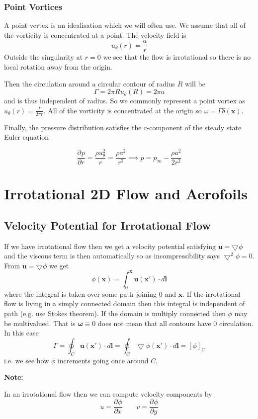 \documentclass[11pt]{article}
\newcommand*{\pd}[3][]{\ensuremath{\frac{\partial^{#1} {#2}}{\partial {#3}^{#1}}}}
\newcommand{\grad}{\bigtriangledown}
\newcommand{\mv}[1]{\bm{#1}}
\newenvironment{note}
    {\textbf{Note:}\begin{mdframed}[backgroundcolor=white, roundcorner=5pt, linewidth=0pt]}
    {\end{mdframed}}
\begin{document}
\subsubsection{Point Vortices}
A point vertex is an idealisation which we will often use.
We assume that all of the vorticity is concentrated at a point.
The velocity field is
\[
	u_\theta(r) = \frac{a}{r}
\]
Outside the singularity at $r=0$ we see that the flow is irrotational so there is no local rotation away from the origin.

Then the circulation around a circular contour of radius $R$ will be
\[
	\Gamma = 2\pi R u_\theta(R) = 2\pi a
\]
and is thus independent of radius.
So we commonly represent a point vortex as $u_\theta(r) = \frac{\Gamma}{2\pi r}$.
All of the vorticity is concentrated at the origin so $\omega = \Gamma \delta(\mv{x})$.

Finally, the pressure distribution satisfies the $r$-component of the steady state Euler equation

\[
	\pd{p}{r}= \frac{\rho u_\theta^2}{r} = \frac{\rho a^2}{r^3} \implies p = p_\infty - \frac{\rho a^2}{2r^2}	
\]

\section{Irrotational 2D Flow and Aerofoils}
\subsection{Velocity Potential for Irrotational Flow}
If we have irrotational flow then we get a velocity potential satisfying $\mv{u}=\grad\phi$ and the viscous term is then automatically so as incompressibility says $\grad^2\phi = 0$.
From $\mv{u}= \grad \phi$ we get
\[
	\phi(\mv{x}) = \int_0^{\mv{x}} \mv{u}(\mv{x}') \cdot d\mv{l}
\]
where the integral is taken over some path joining 0 and $\mv{x}$.
If the irrotational flow is living in a simply connected domain then this integral is independent of path (e.g. use Stokes theorem).
If the domain is multiply connected then $\phi$ may be multivalued.
That is $\mv{\omega}\equiv 0$ does not mean that all contours have $0$ circulation.
In this case
\[
	\Gamma = \oint_C \mv{u}(\mv{x}')\cdot d\mv{l} = \oint_C \grad\phi(\mv{x}')\cdot d\mv{l} = \left[ \phi\right]_C
\]
i.e. we see how $\phi$ increments going once around $C$.

\begin{note}
In an irrotational flow then we can compute velocity components by
\[
	u = \pd{\phi}{x}\quad\quad v = \pd{\phi}{y}
\]
\end{note}
\end{document}
